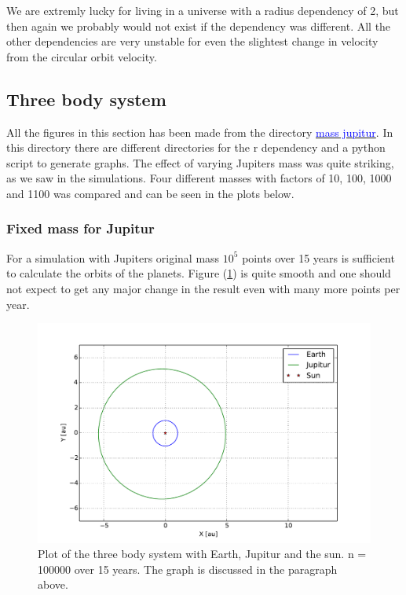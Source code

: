 We are extremly lucky for living in a universe with a radius dependency of 2, but then again we probably would not exist if the dependency was different. All the other dependencies are very unstable for even the slightest change in velocity from the circular orbit velocity.


















\subsection{Three body system}

All the figures in this section has been made from the directory \href{https://github.com/erikfsk/Project-3/tree/master/Project3/mass%20jupitur}{\textcolor{blue}{mass jupitur}}. In this directory there are different directories for the r dependency and a python script to generate graphs. The effect of varying Jupiters mass was quite striking, as we saw in the simulations. Four different masses with factors of 10, 100, 1000 and 1100 was compared and can be seen in the plots below.

\subsubsection{Fixed mass for Jupitur}

For a simulation with Jupiters original mass $10^5$ points over 15 years is sufficient to calculate the orbits of the planets. Figure (\ref{fig:three-body}) is quite smooth and one should not expect to get any major change in the result even with many more points per year. 

\begin{figure}[H]
    \centering
    \includegraphics[width=\linewidth]{result/bilder/jupitur-mass.pdf}
    \caption{Plot of the three body system with Earth, Jupitur and the sun. n = 100000 over 15 years. The graph is discussed in the paragraph above. }
    \label{fig:three-body}
\end{figure}


